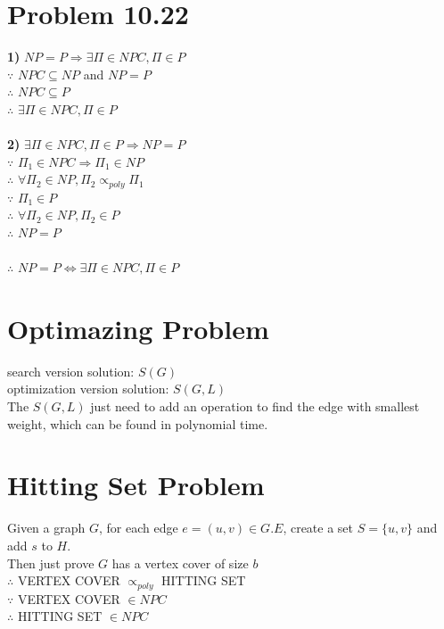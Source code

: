 \documentclass[a4paper]{article}
\begin{document}
\begin{spacing}{1.3}
\section*{Problem 10.22}
\textbf{1)} $NP=P \Rightarrow \exists \Pi \in NPC,\Pi \in P$
\\$\because$ $NPC\subseteq NP$ and $NP=P$
\\$\therefore$ $NPC\subseteq P$
\\$\therefore$ $\exists \Pi \in NPC,\Pi \in P$\\
\\\textbf{2)} $\exists \Pi \in NPC,\Pi \in P \Rightarrow NP=P$
\\$\because$ $\Pi_1 \in NPC\Rightarrow \Pi_1 \in NP$
\\$\therefore$ $\forall \Pi_2 \in NP,\Pi_2 \propto_{poly} \Pi_1$
\\$\because$ $\Pi_1 \in P$
\\$\therefore$ $\forall \Pi_2 \in NP,\Pi_2 \in P$
\\$\therefore$ $NP=P$\\
\\$\therefore$ $NP=P \Leftrightarrow \exists \Pi \in NPC,\Pi \in P$

\section*{Optimazing Problem}
search version solution: $S(G)$
\\optimization version solution: $S(G,L)$
\\The $S(G,L)$ just need to add an operation to find the edge with smallest weight, which can be found in polynomial time.

\section*{Hitting Set Problem}
Given a graph $G$, for each edge $e=(u,v)\in G.E$, create a set $S=\{ u,v\}$ and add $s$ to $H$.
\\Then just prove $G$ has a vertex cover of size $b$
\\$\therefore$ VERTEX COVER $\propto_{poly}$ HITTING SET
\\$\because$ VERTEX COVER $\in NPC$
\\$\therefore$ HITTING SET $\in NPC$

\end{spacing}
\end{document}
